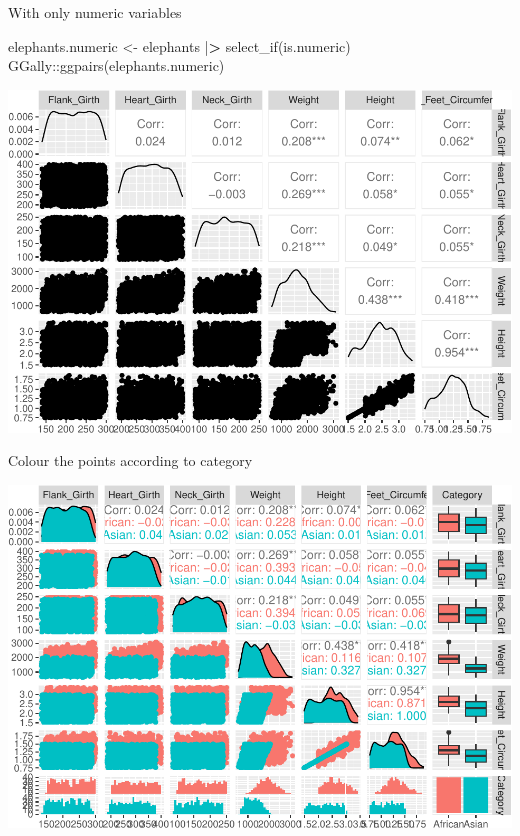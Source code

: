 \documentclass[
]{book}
\newenvironment{Shaded}{\begin{snugshade}}{\end{snugshade}}
\newcommand{\AttributeTok}[1]{\textcolor[rgb]{0.77,0.63,0.00}{#1}}
\newcommand{\ErrorTok}[1]{\textcolor[rgb]{0.64,0.00,0.00}{\textbf{#1}}}
\newcommand{\FunctionTok}[1]{\textcolor[rgb]{0.00,0.00,0.00}{#1}}
\newcommand{\NormalTok}[1]{#1}
\newcommand{\OtherTok}[1]{\textcolor[rgb]{0.56,0.35,0.01}{#1}}
\newcommand{\SpecialCharTok}[1]{\textcolor[rgb]{0.00,0.00,0.00}{#1}}
\begin{document}
With only numeric variables

\begin{Shaded}
\begin{Highlighting}[]
\NormalTok{elephants.numeric }\OtherTok{\textless{}{-}}\NormalTok{ elephants }\SpecialCharTok{|}\ErrorTok{\textgreater{}} \FunctionTok{select\_if}\NormalTok{(is.numeric)     }
\NormalTok{GGally}\SpecialCharTok{::}\FunctionTok{ggpairs}\NormalTok{(elephants.numeric)}
\end{Highlighting}
\end{Shaded}

\includegraphics{Data-Visualisation-geom-Encyclopedia_files/figure-latex/unnamed-chunk-55-1.pdf}

Colour the points according to category

\begin{Shaded}
\end{Shaded}

\includegraphics{Data-Visualisation-geom-Encyclopedia_files/figure-latex/unnamed-chunk-56-1.pdf}

\printbibliography
\end{document}
